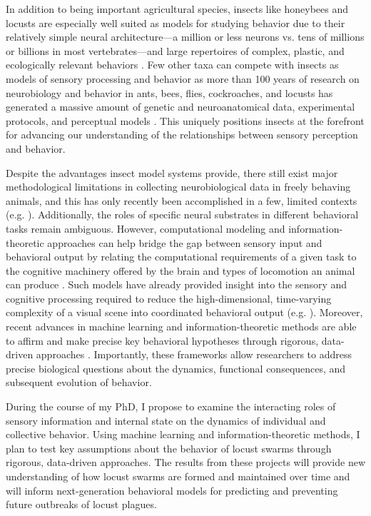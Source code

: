 \documentclass[11pt,a4paper,oneside]{article}
\begin{document}
	\par
	In addition to being important agricultural species, insects like honeybees and locusts are especially well suited as models for studying behavior due to their relatively simple neural architecture---a million or less neurons vs. tens of millions or billions in most vertebrates---and large repertoires of complex, plastic, and ecologically relevant behaviors \citep{haberkern2016studying}. Few other taxa can compete with insects as models of sensory processing and behavior as more than 100 years of research on neurobiology and behavior in ants, bees, flies, cockroaches, and locusts has generated a massive amount of genetic and neuroanatomical data, experimental protocols, and perceptual models \citep{menzel1983neurobiology,burrows1996neurobiology,feany2000drosophila,chittka2006recognition,north2007invertebrate,leonard2014multisensory,haberkern2016studying}. This uniquely positions insects at the forefront for advancing our understanding of the relationships between sensory perception and behavior.
	\par
	Despite the advantages insect model systems provide, there still exist major methodological limitations in collecting neurobiological data in freely behaving animals, and this has only recently been accomplished in a few, limited contexts (e.g. \citealp{martin2015central}). Additionally, the roles of specific neural substrates in different behavioral tasks remain ambiguous. However, computational modeling and information-theoretic approaches can help bridge the gap between sensory input and behavioral output by relating the computational requirements of a given task to the cognitive machinery offered by the brain and types of locomotion an animal can produce \citep{webb2016neural}. Such models have already provided insight into the sensory and cognitive processing required to reduce the high-dimensional, time-varying complexity of a visual scene into coordinated behavioral output (e.g. \citealp{bertrand2015bio,mischiati2015internal}). Moreover, recent advances in machine learning and information-theoretic methods are able to affirm and make precise key behavioral hypotheses through rigorous, data-driven approaches \citep{berman2014drosopholid,berman2014mapping,berman2016predictability,klibaite2017unsupervised,todd2017exploration,wiltschko2015,twomey2016vision}. Importantly, these frameworks allow researchers to address precise biological questions about the dynamics, functional consequences, and subsequent evolution of behavior. 
	\par
	During the course of my PhD, I propose to examine the interacting roles of sensory information and internal state on the dynamics of individual and collective behavior. Using machine learning and information-theoretic methods, I plan to test key assumptions about the behavior of locust swarms through rigorous, data-driven approaches. The results from these projects will provide new understanding of how locust swarms are formed and maintained over time and will inform next-generation behavioral models for predicting and preventing future outbreaks of locust plagues.
\end{document}
